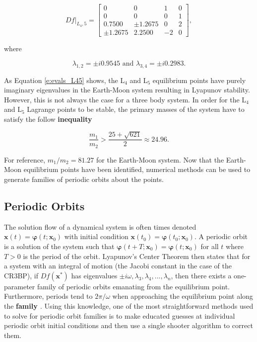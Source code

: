 \documentclass[11pt]{article} %
\begin{document}
\doublespacing
\begin{equation}
	\label{e:df_eval_L45}
	Df|_{L_4,5} = 
	\begin{bmatrix} 
		0 & 0 & 1  & 0 \\ 
		0 & 0 & 0 & 1 \\
		0.7500 & \pm1.2675 & 0 & 2 \\
		\pm1.2675 & 2.2500 & -2 & 0
	\end{bmatrix},
\end{equation}
\singlespacing

\noindent
where

\begin{equation}
	\label{e:evals_L45}
	\lambda_{1,2} = \pm i0.9545 \text{ and } \lambda_{3,4} = \pm i0.2983.
\end{equation}

\noindent
As Equation \ref{e:evals_L45} shows, the L$_4$ and L$_5$ equilibrium points have purely imaginary eigenvalues in the Earth-Moon system resulting in Lyapunov stability. However, this is not always the case for a three body system. In order for the L$_4$ and L$_5$ Lagrange points to be stable, the primary masses of the system have to satisfy the follow \textbf{inequality \cite{ScheersBook}}

\begin{equation}
	\frac{m_1}{m_2} > \frac{25+\sqrt{621}}{2}\approx24.96.
\end{equation}

\noindent
For reference, $m_1/m_2=81.27$ for the Earth-Moon system. Now that the Earth-Moon equilibrium points have been identified, numerical methods can be used to generate families of periodic orbits about the points.

\subsection{Periodic Orbits}
The solution flow of a dynamical system is often times denoted $\bm{x}\left(t\right)=\bm{\varphi}\left(t;\bm{x}_0\right)$ with initial condition $\bm{x}\left(t_0\right)=\bm{\varphi}\left(t_0;\bm{x}_0\right)$. A periodic orbit is a solution of the system such that $\bm{\varphi}\left(t+T;\bm{x}_0\right) = \bm{\varphi}\left(t;\bm{x}_0\right)$ for all $t$ where $T>0$ is the period of the orbit. Lyapunov's Center Theorem then states that for a system with an integral of motion (the Jacobi constant in the case of the CR3BP), if $Df\left(\bm{x}^*\right)$ has eigenvalues $\pm i\omega, \lambda_3, \lambda_4,...,\lambda_n$, then there exists a one-parameter family of periodic orbits emanating from the equilibrium point. Furthermore, periods tend to $2\pi/\omega$ when approaching the equilibrium point along the \textbf{family \cite{MeyerandHallBook}}. Using this knowledge, one of the most straightforward methods used to solve for periodic orbit families is to make educated guesses at individual periodic orbit initial conditions and then use a single shooter algorithm to correct them. 
\end{document}
